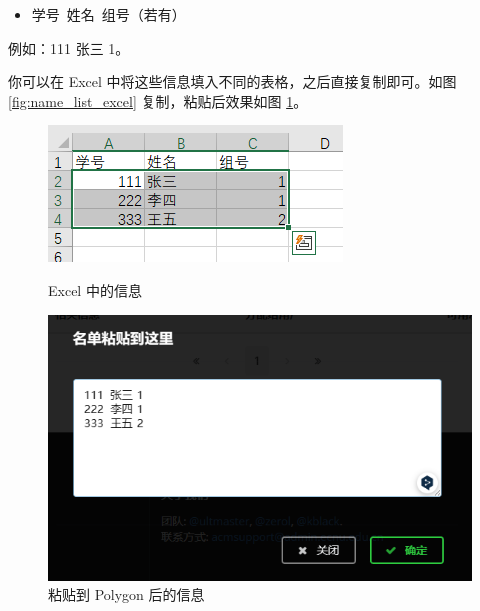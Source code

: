 \documentclass[oneside]{book}
\begin{document}
\begin{itemize}
  \item 学号\ 姓名\ 组号（若有）
\end{itemize}

例如：111 张三 1。

你可以在 Excel 中将这些信息填入不同的表格，之后直接复制即可。如图 \ref{fig:name_list_excel} 复制，粘贴后效果如图 \ref{fig:name_list_show}。

\begin{figure}[htbp]
  \centering
  \begin{minipage}{0.4\textwidth}
    \centering
    \includegraphics[width=\textwidth]{res/name_list_excel.png}
    \caption{Excel 中的信息}
    \label{fig:name_list_excel}
  \end{minipage}
  \hspace{0.1\textwidth}
  \begin{minipage}{0.4\textwidth}
    \centering
    \includegraphics[width=\textwidth]{res/name_list_show.png}
    \caption{粘贴到 Polygon 后的信息}
    \label{fig:name_list_show}
  \end{minipage}
\end{figure}
\end{document}
